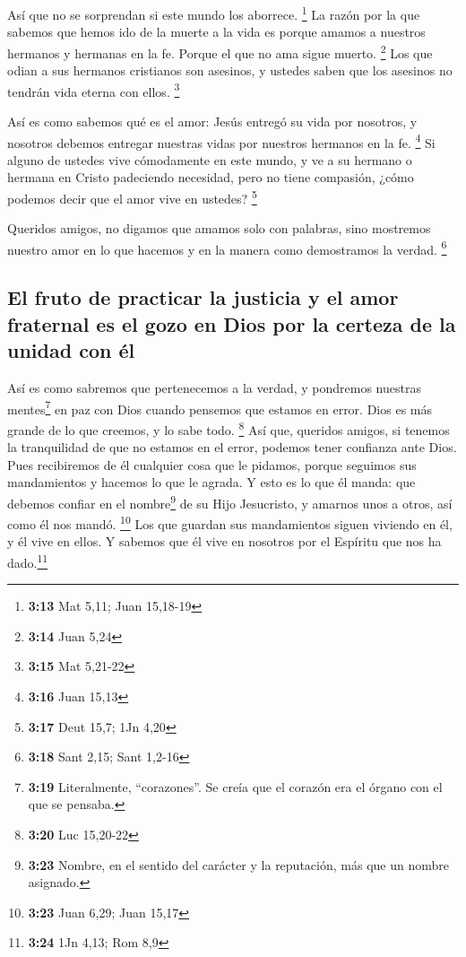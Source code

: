  Así que no se sorprendan si este mundo los aborrece.
\footnote{\textbf{3:13} Mat 5,11; Juan 15,18-19}  La
razón por la que sabemos que hemos ido de la muerte a la vida es porque
amamos a nuestros hermanos y hermanas en la fe. Porque el que no ama
sigue muerto. \footnote{\textbf{3:14} Juan 5,24}  Los que
odian a sus hermanos cristianos son asesinos, y ustedes saben que los
asesinos no tendrán vida eterna con ellos. \footnote{\textbf{3:15} Mat
  5,21-22}

 Así es como sabemos qué es el amor: Jesús entregó su
vida por nosotros, y nosotros debemos entregar nuestras vidas por
nuestros hermanos en la fe. \footnote{\textbf{3:16} Juan 15,13}
 Si alguno de ustedes vive cómodamente en este mundo, y
ve a su hermano o hermana en Cristo padeciendo necesidad, pero no tiene
compasión, ¿cómo podemos decir que el amor vive en ustedes? \footnote{\textbf{3:17}
  Deut 15,7; 1Jn 4,20}

 Queridos amigos, no digamos que amamos solo con
palabras, sino mostremos nuestro amor en lo que hacemos y en la manera
como demostramos la verdad. \footnote{\textbf{3:18} Sant 2,15; Sant
  1,2-16}

\hypertarget{el-fruto-de-practicar-la-justicia-y-el-amor-fraternal-es-el-gozo-en-dios-por-la-certeza-de-la-unidad-con-uxe9l}{%
\subsection{El fruto de practicar la justicia y el amor fraternal es el
gozo en Dios por la certeza de la unidad con
él}\label{el-fruto-de-practicar-la-justicia-y-el-amor-fraternal-es-el-gozo-en-dios-por-la-certeza-de-la-unidad-con-uxe9l}}

 Así es como sabremos que pertenecemos a la verdad, y
pondremos nuestras mentes\footnote{\textbf{3:19} Literalmente,
  ``corazones''. Se creía que el corazón era el órgano con el que se
  pensaba.} en paz con Dios  cuando pensemos que estamos
en error. Dios es más grande de lo que creemos, y lo sabe todo.
\footnote{\textbf{3:20} Luc 15,20-22}  Así que, queridos
amigos, si tenemos la tranquilidad de que no estamos en el error,
podemos tener confianza ante Dios.  Pues recibiremos de
él cualquier cosa que le pidamos, porque seguimos sus mandamientos y
hacemos lo que le agrada.  Y esto es lo que él manda: que
debemos confiar en el nombre\footnote{\textbf{3:23} Nombre, en el
  sentido del carácter y la reputación, más que un nombre asignado.} de
su Hijo Jesucristo, y amarnos unos a otros, así como él nos mandó.
\footnote{\textbf{3:23} Juan 6,29; Juan 15,17}  Los que
guardan sus mandamientos siguen viviendo en él, y él vive en ellos. Y
sabemos que él vive en nosotros por el Espíritu que nos ha
dado.\footnote{\textbf{3:24} 1Jn 4,13; Rom 8,9}

